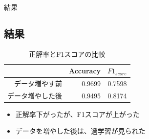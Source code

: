 \documentclass[leno,xcolor=dvipsnames]{beamer}
\begin{document}
  \begin{frame}{結果}
    \subsection{結果}
    \begin{table}[H]
      \centering
      \caption{正解率とF1スコアの比較}
      \begin{tabular}{rrr}
        \toprule
        & Accuracy & $F1_{score}$ \\
        \midrule
        データ増やす前 & 0.9699 & 0.7598 \\
        データ増やした後 & 0.9495 & 0.8174 \\
        \bottomrule
      \end{tabular}
      \begin{itemize}
        \item 正解率下がったが、F1スコアが上がった
        \item データを増やした後は、過学習が見られた
      \end{itemize}
    \end{table}
  \end{frame}
\end{document}
